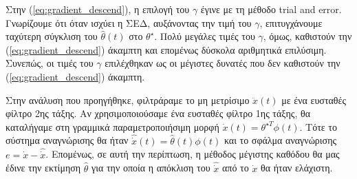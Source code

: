 \documentclass[a4paper,12pt]{article}
\begin{document}
Στην (\ref{eq:gradient_descend}), η επιλογή του $\gamma$ έγινε με τη μέθοδο trial and 
error. Γνωρίζουμε ότι όταν ισχύει η ΣΕΔ, αυξάνοντας την τιμή του $\gamma$, επιτυγχάνουμε 
ταχύτερη σύγκλιση του $\hat{\theta}(t)$ στο $\theta^{\star}$. Πολύ μεγάλες τιμές του $\gamma$, όμως, καθιστούν 
την (\ref{eq:gradient_descend}) άκαμπτη και επομένως δύσκολα αριθμητικά επιλύσιμη. Συνεπώς, οι τιμές του 
$\gamma$ επιλέχθηκαν ως οι μέγιστες δυνατές που δεν καθιστούν την (\ref{eq:gradient_descend}) άκαμπτη.

Στην ανάλυση που προηγήθηκε, φιλτράραμε το μη μετρίσιμο $\ddot{x}(t)$ με ένα ευσταθές φίλτρο 2ης τάξης. Αν 
χρησιμοποιούσαμε ένα ευσταθές φίλτρο 1ης τάξης, θα καταλήγαμε στη γραμμικά παραμετροποιήσιμη μορφή
$\dot{x}(t) = \theta^{\star T} \phi(t)$. Τότε το σύστημα αναγνώρισης θα ήταν 
$\hat{\dot{x}}(t) = \hat{\theta}(t)\phi(t)$ και το σφάλμα αναγνώρισης $e = \dot{x} - \hat{\dot{x}}$. 
Επομένως, σε αυτή την περίπτωση, η μέθοδος μέγιστης καθόδου θα μας έδινε την εκτίμηση $\hat{\theta}$ για την 
οποία η απόκλιση του $\hat{\dot{x}}$ από το $\dot{x}$ θα ήταν ελάχιστη.
\end{document}
